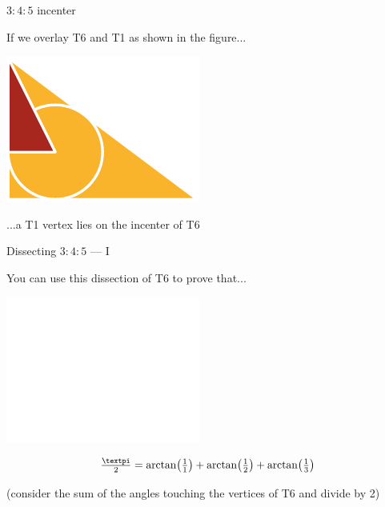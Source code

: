 \documentclass[14pt]{beamer}
\begin{document}

    \begin{frame}{$3\!\!:\!\!4\!\!:\!\!5$ incenter}
        \begin{center}
            If we overlay T6 and T1 as shown in the figure...

            \bigskip \bigskip

            \includegraphics[height=18ex]{figures/figure006b.pdf}

            \bigskip \bigskip

            ...a T1 vertex lies on the incenter of T6
        \end{center}
    \end{frame}


    \begin{frame}{Dissecting $3\!\!:\!\!4\!\!:\!\!5$ --- I}
        \begin{center}
            You can use this dissection of T6 to prove that...

            \bigskip\bigskip

            \includegraphics[height=18ex]{figures/figure006c.pdf}\vspace{-1em}

            $$\tfrac{\text{\textpi}}{2} = \arctan{\!\left(\tfrac{1}{1}\right)} + \arctan{\!\left(\tfrac{1}{2}\right)} + \arctan{\!\left(\tfrac{1}{3}\right)}$$

            {\footnotesize(consider the sum of the angles touching the vertices of T6 and divide by 2)}
        \end{center}
    \end{frame}
\end{document}
